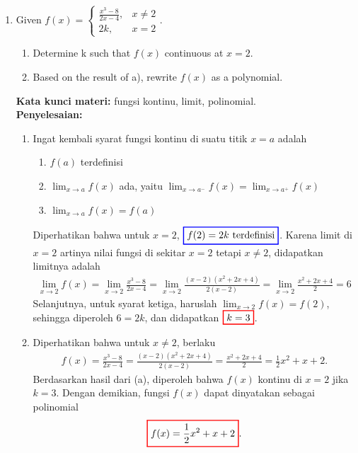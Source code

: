 \documentclass[10pt,openany,a4paper]{article}
\theoremstyle{definition}
\theoremstyle{definition}
\theoremstyle{plain}
\newenvironment{jawab}[2][tes]{
\textbf{Kata kunci materi:} #1.\\
\textbf{Penyelesaian:} #2
}{}
\begin{document}
\begin{enumerate}
    \item Given \(f(x) = \begin{cases} \frac{x^3-8}{2x-4}, & x \neq 2 \\ 2k, & x=2 \end{cases}\).
    \begin{enumerate}
        \item[a.] Determine k such that \(f(x)\) continuous at \(x = 2\).
        \item[b.] Based on the result of a), rewrite \(f(x)\) as a polynomial.
    \end{enumerate}
    \begin{jawab}[fungsi kontinu, limit, polinomial]{
        \begin{enumerate}
            \item Ingat kembali syarat fungsi kontinu di suatu titik \(x = a\) adalah
            \begin{enumerate}
                \item \(f(a)\) terdefinisi
                \item \(\displaystyle \lim_{x \to a} f(x)\) ada, yaitu $\displaystyle \lim_{x \to a^-} f(x) = \lim_{x \to a^+} f(x)$
                \item \(\displaystyle\lim_{x \to a} f(x) = f(a)\)
            \end{enumerate} 
            Diperhatikan bahwa untuk \(x = 2\), $\colorlet{oldcolor}{.}
        \color{blue}
        \setlength{\fboxrule}{1pt} \boxed{\color{oldcolor}f(2) = 2k~\text{terdefinisi}}\color{oldcolor}$. Karena limit di $x=2$ artinya nilai fungsi di sekitar $x=2$ tetapi $x\neq 2$, didapatkan limitnya adalah
            \begin{align*}
            \lim_{x \to 2} f(x) = \lim_{x \to 2} \frac{x^3 - 8}{2x - 4} = \lim_{x \to 2} \frac{(x-2)(x^2 + 2x + 4)}{2(x-2)} = \lim_{x \to 2} \frac{x^2 + 2x + 4}{2} = 6
            \end{align*}
            Selanjutnya, untuk syarat ketiga, haruslah $\displaystyle\lim_{x \to 2} f(x) = f(2)$, sehingga diperoleh $6 = 2k$, dan didapatkan $\colorlet{oldcolor}{.}
        \color{red}
        \setlength{\fboxrule}{1pt} \boxed{\color{oldcolor}k=3}\color{oldcolor}$.
        \item Diperhatikan bahwa untuk $x\neq 2$, berlaku
        \begin{align*}
            f(x) = \frac{x^3 - 8}{2x - 4} = \frac{(x-2)(x^2 + 2x + 4)}{2(x-2)} = \frac{x^2 + 2x + 4}{2} = \frac{1}{2}x^2 + x + 2.
        \end{align*}
        Berdasarkan hasil dari (a), diperoleh bahwa \(f(x)\) kontinu di \(x=2\) jika \(k=3\). Dengan demikian, fungsi \(f(x)\) dapat dinyatakan sebagai polinomial
        \begin{align*}
            \colorlet{oldcolor}{.}
        \color{red}
        \setlength{\fboxrule}{1pt} \boxed{\color{oldcolor}f(x) = \frac{1}{2}x^2 + x + 2}\color{oldcolor}.
        \end{align*}
        \end{enumerate}
    }
    \end{jawab}


\end{enumerate}
\end{document}
